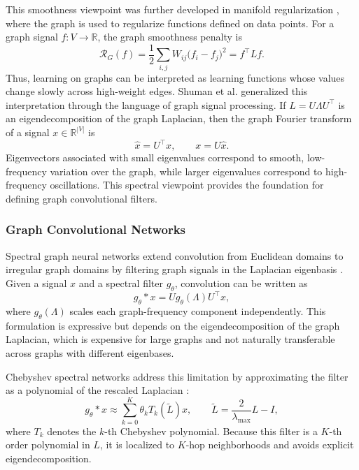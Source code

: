 \documentclass[11pt]{article}
\theoremstyle{definition}
\begin{document}
This smoothness viewpoint was further developed in manifold regularization \cite{belkin2006manifold}, where the graph is used to regularize functions defined on data points. For a graph signal $f : V \to \mathbb{R}$, the graph smoothness penalty is
\[
    \mathcal{R}_{G}(f)
    = \frac{1}{2}\sum_{i,j} W_{ij}\big(f_i - f_j\big)^2
    = f^\top L f.
\]
Thus, learning on graphs can be interpreted as learning functions whose values change slowly across high-weight edges. Shuman et al. \cite{shuman2013emerging} generalized this interpretation through the language of graph signal processing. If $L = U\Lambda U^\top$ is an eigendecomposition of the graph Laplacian, then the graph Fourier transform of a signal $x \in \mathbb{R}^{|V|}$ is
\[
    \widehat{x} = U^\top x,
    \qquad
    x = U\widehat{x}.
\]
Eigenvectors associated with small eigenvalues correspond to smooth, low-frequency variation over the graph, while larger eigenvalues correspond to high-frequency oscillations. This spectral viewpoint provides the foundation for defining graph convolutional filters.

\subsubsection{Graph Convolutional Networks}
Spectral graph neural networks extend convolution from Euclidean domains to irregular graph domains by filtering graph signals in the Laplacian eigenbasis \cite{bruna2014spectral,defferrard2016convolutional,kipf2017semi}. Given a signal $x$ and a spectral filter $g_\theta$, convolution can be written as
\[
    g_\theta * x
    = U g_\theta(\Lambda) U^\top x,
\]
where $g_\theta(\Lambda)$ scales each graph-frequency component independently. This formulation is expressive but depends on the eigendecomposition of the graph Laplacian, which is expensive for large graphs and not naturally transferable across graphs with different eigenbases.

Chebyshev spectral networks address this limitation by approximating the filter as a polynomial of the rescaled Laplacian \cite{defferrard2016convolutional}:
\[
    g_\theta * x
    \approx \sum_{k=0}^{K} \theta_k T_k(\widetilde{L})x,
    \qquad
    \widetilde{L} = \frac{2}{\lambda_{\max}}L - I,
\]
where $T_k$ denotes the $k$-th Chebyshev polynomial. Because this filter is a $K$-th order polynomial in $L$, it is localized to $K$-hop neighborhoods and avoids explicit eigendecomposition.
\end{document}

